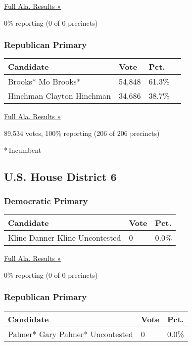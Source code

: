 \href{https://www.nytimes3xbfgragh.onion/elections/results/alabama}{Full
Ala. Results »}

0\% reporting (0 of 0 precincts)

\hypertarget{republican-primary-5}{%
\subsubsection{Republican Primary}\label{republican-primary-5}}

\begin{longtable}[]{@{}llll@{}}
\toprule
Candidate & Vote & Pct. &\tabularnewline
\midrule
\endhead
 Brooks* Mo Brooks* & 54,848 & 61.3\% &\tabularnewline
 Hinchman Clayton Hinchman & 34,686 & 38.7\% &\tabularnewline
\bottomrule
\end{longtable}

\href{https://www.nytimes3xbfgragh.onion/elections/results/alabama}{Full
Ala. Results »}

89,534 votes, 100\% reporting (206 of 206 precincts)

* Incumbent

\hypertarget{us-house-district-6}{%
\subsection{U.S. House District 6}\label{us-house-district-6}}

\hypertarget{democratic-primary-6}{%
\subsubsection{Democratic Primary}\label{democratic-primary-6}}

\begin{longtable}[]{@{}lll@{}}
\toprule
Candidate & Vote & Pct.\tabularnewline
\midrule
\endhead
 Kline Danner Kline Uncontested & 0 & 0.0\%\tabularnewline
\bottomrule
\end{longtable}

\href{https://www.nytimes3xbfgragh.onion/elections/results/alabama}{Full
Ala. Results »}

0\% reporting (0 of 0 precincts)

\hypertarget{republican-primary-6}{%
\subsubsection{Republican Primary}\label{republican-primary-6}}

\begin{longtable}[]{@{}lll@{}}
\toprule
Candidate & Vote & Pct.\tabularnewline
\midrule
\endhead
 Palmer* Gary Palmer* Uncontested & 0 & 0.0\%\tabularnewline
\bottomrule
\end{longtable}


